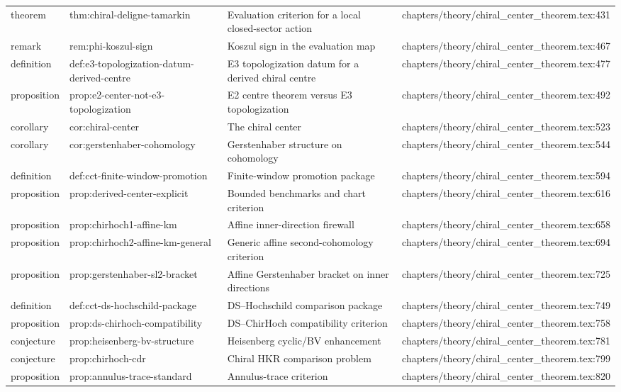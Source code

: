 \documentclass[11pt]{article}
\begin{document}
\begin{longtable}{L{0.10\textwidth}L{0.26\textwidth}L{0.42\textwidth}L{0.22\textwidth}}
theorem & thm:chiral-deligne-tamarkin & Evaluation criterion for a local closed-sector action & chapters/theory/chiral\_center\_theorem.tex:431\\
remark & rem:phi-koszul-sign & Koszul sign in the evaluation map & chapters/theory/chiral\_center\_theorem.tex:467\\
definition & def:e3-topologization-datum-derived-centre & E3 topologization datum for a derived chiral centre & chapters/theory/chiral\_center\_theorem.tex:477\\
proposition & prop:e2-center-not-e3-topologization & E2 centre theorem versus E3 topologization & chapters/theory/chiral\_center\_theorem.tex:492\\
corollary & cor:chiral-center & The chiral center & chapters/theory/chiral\_center\_theorem.tex:523\\
corollary & cor:gerstenhaber-cohomology & Gerstenhaber structure on cohomology & chapters/theory/chiral\_center\_theorem.tex:544\\
definition & def:cct-finite-window-promotion & Finite-window promotion package & chapters/theory/chiral\_center\_theorem.tex:594\\
proposition & prop:derived-center-explicit & Bounded benchmarks and chart criterion & chapters/theory/chiral\_center\_theorem.tex:616\\
proposition & prop:chirhoch1-affine-km & Affine inner-direction firewall & chapters/theory/chiral\_center\_theorem.tex:658\\
proposition & prop:chirhoch2-affine-km-general & Generic affine second-cohomology criterion & chapters/theory/chiral\_center\_theorem.tex:694\\
proposition & prop:gerstenhaber-sl2-bracket & Affine Gerstenhaber bracket on inner directions & chapters/theory/chiral\_center\_theorem.tex:725\\
definition & def:cct-ds-hochschild-package & DS--Hochschild comparison package & chapters/theory/chiral\_center\_theorem.tex:749\\
proposition & prop:ds-chirhoch-compatibility & DS--ChirHoch compatibility criterion & chapters/theory/chiral\_center\_theorem.tex:758\\
conjecture & prop:heisenberg-bv-structure & Heisenberg cyclic/BV enhancement & chapters/theory/chiral\_center\_theorem.tex:781\\
conjecture & prop:chirhoch-cdr & Chiral HKR comparison problem & chapters/theory/chiral\_center\_theorem.tex:799\\
proposition & prop:annulus-trace-standard & Annulus-trace criterion & chapters/theory/chiral\_center\_theorem.tex:820\\

\end{longtable}
\end{document}
